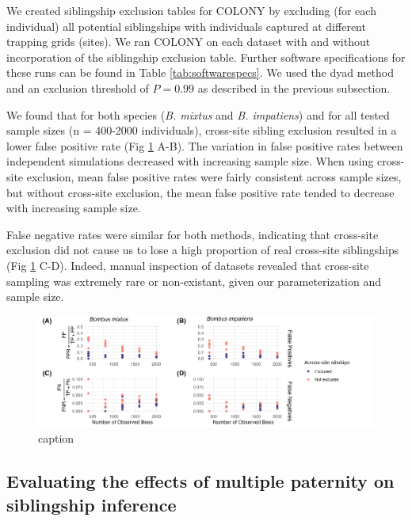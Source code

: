 \documentclass[12pt]{article}
\begin{document}
We created siblingship exclusion tables for COLONY by excluding (for each individual) all potential siblingships with individuals captured at different trapping grids (sites). We ran COLONY on each dataset with and without incorporation of the siblingship exclusion table. Further software specifications for these runs can be found in Table \ref{tab:softwarespecs}. We used the dyad method and an exclusion threshold of $P = 0.99$ as described in the previous subsection.

We found that for both species (\emph{B. mixtus} and \emph{B. impatiens}) and for all tested sample sizes (n = 400-2000 individuals), cross-site sibling exclusion resulted in a lower false positive rate (Fig \ref{fig:excl_size} A-B). The variation in false positive rates between independent simulations decreased with increasing sample size. When using cross-site exclusion, mean false positive rates were fairly consistent across sample sizes, but without cross-site exclusion, the mean false positive rate tended to decrease with increasing sample size.

False negative rates were similar for both methods, indicating that cross-site exclusion did not cause us to lose a high proportion of real cross-site siblingships (Fig \ref{fig:excl_size} C-D). Indeed, manual inspection of datasets revealed that cross-site sampling was extremely rare or non-existant, given our parameterization and sample size.

\begin{figure}[H]
    \centering
    \includegraphics[width=\linewidth]{appendix_figures/excl_size.jpg}
    \caption{caption}
    \label{fig:excl_size}
\end{figure}


\subsection{Evaluating the effects of multiple paternity on siblingship inference}
\end{document}
